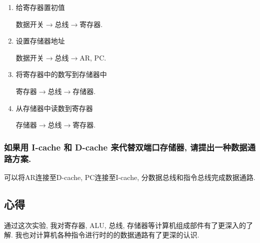 \documentclass[../main.tex]{subfiles}
\begin{document}
\begin{enumerate}

    \item 给寄存器置初值

          数据开关$\rightarrow$总线$\rightarrow$寄存器.

    \item 设置存储器地址

          数据开关$\rightarrow$总线$\rightarrow$AR, PC.

    \item 将寄存器中的数写到存储器中

          寄存器$\rightarrow$总线$\rightarrow$存储器.

    \item 从存储器中读数到寄存器

          存储器$\rightarrow$总线$\rightarrow$寄存器.

\end{enumerate}

\subsubsection{如果用 I-cache 和 D-cache 来代替双端口存储器, 请提出一种数据通路方案.}

可以将AR连接至D-cache, PC连接至I-cache, 分数据总线和指令总线完成数据通路.

\subsection{心得}

通过这次实验, 我对寄存器, ALU, 总线, 存储器等计算机组成部件有了更深入的了解.
我也对计算机各种指令进行时的的数据通路有了更深的认识.
\end{document}
